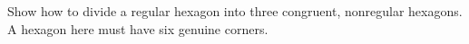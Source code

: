 Show how to divide a regular hexagon into three congruent, nonregular hexagons. A hexagon here must have six genuine corners.
